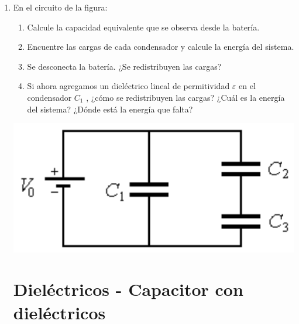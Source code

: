 \documentclass[11pt,spanish,a4paper]{article}
\begin{document}
\begin{enumerate}
	\item \begin{minipage}[t]{0.7\textwidth}
		En el circuito de la figura:
		\begin{enumerate}
			\item Calcule la capacidad equivalente que se observa desde la batería.
			\item Encuentre las cargas de cada condensador y calcule la energía del sistema.
			\item Se desconecta la batería. ¿Se redistribuyen las cargas?
			\item Si ahora agregamos un dieléctrico lineal de permitividad \(\varepsilon\) en el condensador \(C_1\) , ¿cómo se redistribuyen las cargas?
				¿Cuál es la energía del sistema?
				¿Dónde está la energía que falta?
		\end{enumerate}
    \end{minipage}
    \begin{minipage}[c][1em][t]{0.25\textwidth}
            \includegraphics[width=\textwidth]{p2e08}
    \end{minipage}



\section*{Dieléctricos - Capacitor con dieléctricos}


\end{enumerate}
\end{document}
